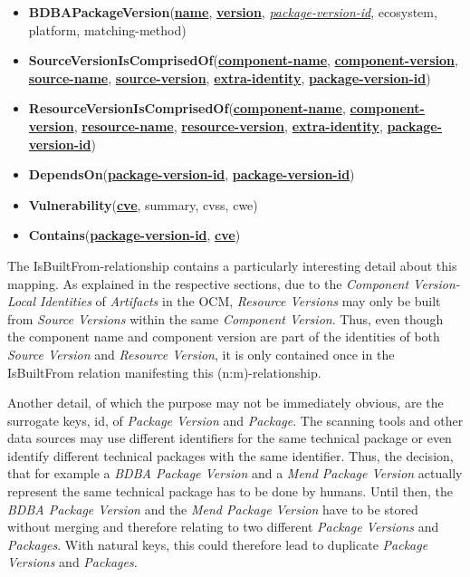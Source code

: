 \begin{itemize}
	\item \textbf{BDBAPackageVersion}(\textbf{\underline{name}}, \textbf{\underline{version}}, \underline{\textit{package-version-id}}, ecosystem, platform, matching-method)
	\item \textbf{SourceVersionIsComprisedOf}(\textbf{\underline{component-name}}, \textbf{\underline{component-version}}, \textbf{\underline{source-name}}, \textbf{\underline{source-version}}, \textbf{\underline{extra-identity}}, \textbf{\underline{package-version-id}})
	\item \textbf{ResourceVersionIsComprisedOf}(\textbf{\underline{component-name}}, \textbf{\underline{component-version}}, \textbf{\underline{resource-name}}, \textbf{\underline{resource-version}}, \textbf{\underline{extra-identity}}, \textbf{\underline{package-version-id}})
	\item \textbf{DependsOn}(\textbf{\underline{package-version-id}}, \textbf{\underline{package-version-id}})
	\item \textbf{Vulnerability}(\textbf{\underline{cve}}, summary, cvss, cwe)
	\item \textbf{Contains}(\textbf{\underline{package-version-id}}, \textbf{\underline{cve}})
\end{itemize}

The IsBuiltFrom-relationship contains a particularly interesting detail about this mapping. As explained in the respective sections, due to the \emph{Component Version-Local Identities} of \emph{Artifacts} in the OCM, \emph{Resource Versions} may only be built from \emph{Source Versions} within the same \emph{Component Version}. Thus, even though the component name and component version are part of the identities of both \emph{Source Version} and \emph{Resource Version}, it is only contained once in the IsBuiltFrom relation manifesting this (n:m)-relationship.\par
Another detail, of which the purpose may not be immediately obvious, are the surrogate keys, id, of \emph{Package Version} and \emph{Package}. The scanning tools and other data sources may use different identifiers for the same technical package or even identify different technical packages with the same identifier. Thus, the decision, that for example a \emph{BDBA Package Version} and a \emph{Mend Package Version} actually represent the same technical package has to be done by humans. Until then, the \emph{BDBA Package Version} and the \emph{Mend Package Version} have to be stored without merging and therefore relating to two different \emph{Package Versions} and \emph{Packages}. With natural keys, this could therefore lead to duplicate \emph{Package Versions} and \emph{Packages}.

